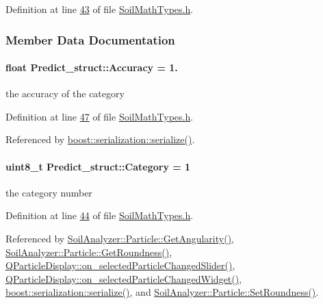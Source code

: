 Definition at line \hyperlink{_soil_math_types_8h_source_l00043}{43} of file \hyperlink{_soil_math_types_8h_source}{Soil\+Math\+Types.\+h}.



\subsubsection{Member Data Documentation}
\hypertarget{struct_predict__struct_a587f18ac05cd65437327a54261d1e22c}{}
\paragraph[{Accuracy}]{\setlength{\rightskip}{0pt plus 5cm}float Predict\+\_\+struct\+::\+Accuracy = 1.}\label{struct_predict__struct_a587f18ac05cd65437327a54261d1e22c}
the accuracy of the category 

Definition at line \hyperlink{_soil_math_types_8h_source_l00047}{47} of file \hyperlink{_soil_math_types_8h_source}{Soil\+Math\+Types.\+h}.



Referenced by \hyperlink{predict__t__archive_8h_source_l00025}{boost\+::serialization\+::serialize()}.

\hypertarget{struct_predict__struct_a7d1bc56f771ba19cb333163557648714}{}
\paragraph[{Category}]{\setlength{\rightskip}{0pt plus 5cm}uint8\+\_\+t Predict\+\_\+struct\+::\+Category = 1}\label{struct_predict__struct_a7d1bc56f771ba19cb333163557648714}
the category number 

Definition at line \hyperlink{_soil_math_types_8h_source_l00044}{44} of file \hyperlink{_soil_math_types_8h_source}{Soil\+Math\+Types.\+h}.



Referenced by \hyperlink{particle_8cpp_source_l00079}{Soil\+Analyzer\+::\+Particle\+::\+Get\+Angularity()}, \hyperlink{particle_8cpp_source_l00084}{Soil\+Analyzer\+::\+Particle\+::\+Get\+Roundness()}, \hyperlink{qparticledisplay_8cpp_source_l00124}{Q\+Particle\+Display\+::on\+\_\+selected\+Particle\+Changed\+Slider()}, \hyperlink{qparticledisplay_8cpp_source_l00110}{Q\+Particle\+Display\+::on\+\_\+selected\+Particle\+Changed\+Widget()}, \hyperlink{predict__t__archive_8h_source_l00025}{boost\+::serialization\+::serialize()}, and \hyperlink{particle_8cpp_source_l00089}{Soil\+Analyzer\+::\+Particle\+::\+Set\+Roundness()}.

